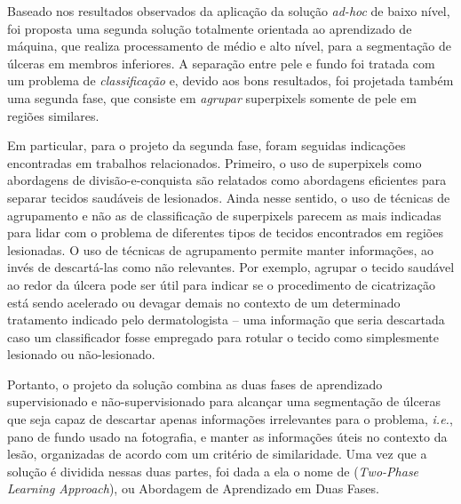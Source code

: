 Baseado nos resultados observados da aplicação da solução \textit{ad-hoc} de baixo nível, foi proposta uma segunda solução totalmente orientada ao aprendizado de máquina, que realiza processamento de médio e alto nível, para a segmentação de úlceras em membros inferiores.
A separação entre pele e fundo foi tratada com um problema de \textit{classificação} e, devido aos bons resultados, foi projetada também uma segunda fase, que consiste em \textit{agrupar} superpixels somente de pele em regiões similares.

Em particular, para o projeto da segunda fase, foram seguidas indicações encontradas em trabalhos relacionados.
Primeiro, o uso de superpixels como abordagens de divisão-e-conquista são relatados como abordagens eficientes para separar tecidos saudáveis de lesionados.
Ainda nesse sentido, o uso de técnicas de agrupamento e não as de classificação de superpixels parecem as mais indicadas para lidar com o problema de diferentes tipos de tecidos encontrados em regiões lesionadas.
O uso de técnicas de agrupamento permite manter informações, ao invés de descartá-las como não relevantes.
Por exemplo, agrupar o tecido saudável ao redor da úlcera pode ser útil para indicar se o procedimento de cicatrização está sendo acelerado ou devagar demais no contexto de um determinado tratamento indicado pelo dermatologista -- uma informação que seria descartada caso um classificador fosse empregado para rotular o tecido como simplesmente lesionado ou não-lesionado.

Portanto, o projeto da solução combina as duas fases de aprendizado supervisionado e não-supervisionado para alcançar uma segmentação de úlceras que seja capaz de descartar apenas informações irrelevantes para o problema, \textit{i.e.}, pano de fundo usado na fotografia, e manter as informações úteis no contexto da lesão, organizadas de acordo com um critério de similaridade.
Uma vez que a solução é dividida nessas duas partes, foi dada a ela o nome de \system (\textit{Two-Phase Learning Approach}), ou Abordagem de Aprendizado em Duas Fases.

